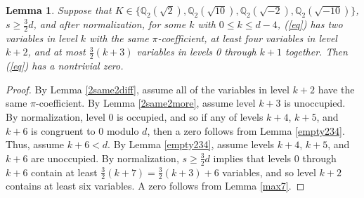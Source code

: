 \documentclass[12pt]{amsart}
\newtheorem{lemma}{Lemma}
\begin{document}
\begin{lemma} \label{threeokay}
Suppose that $K \in \{\mathbb{Q}_2(\sqrt{2}), \mathbb{Q}_2(\sqrt{10}), \mathbb{Q}_2(\sqrt{-2}), \mathbb{Q}_2(\sqrt{-10})\}$, $s \ge \frac{3}{2}d$, and after normalization, for some $k$ with $0 \le k \le d-4$, (\ref{eq}) has two variables in level $k$ with the same $\pi$-coefficient, at least four variables in level $k+2$, and at most $\frac{3}{2}(k+3)$ variables in levels 0 through $k+1$ together.  Then (\ref{eq}) has a nontrivial zero.
\end{lemma}
\begin{proof}
By Lemma \ref{2same2diff}, assume all of the variables in level $k+2$ have the same $\pi$-coefficient.  By Lemma \ref{2same2more}, assume level $k+3$ is unoccupied.  By normalization, level 0 is occupied, and so if any of levels $k+4$, $k+5$, and $k+6$ is congruent to $0$ modulo $d$, then a zero follows from Lemma \ref{empty234}. Thus, assume $k+6 < d$.  By Lemma \ref{empty234}, assume levels $k+4$, $k+5$, and $k+6$ are unoccupied.  By normalization, $s \ge \frac{3}{2}d$ implies that levels 0 through $k+6$ contain at least $\frac{3}{2}(k+7) = \frac{3}{2}(k+3) + 6$ variables, and so level $k+2$ contains at least six variables.  A zero follows from Lemma \ref{max7}.
\end{proof}
\end{document}
